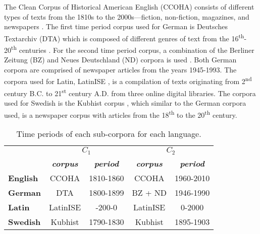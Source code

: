 The Clean Corpus of Historical American English (CCOHA) consists of different types of texts from the 1810s to the 2000s—fiction, non-fiction, magazines, and newspapers \citep{davies2012expanding, alatrash-etal-2020-ccoha}. The first time period corpus used for German is Deutsches Textarchiv (DTA) which is composed of different genres of text from the 16\textsuperscript{th}-20\textsuperscript{th} centuries \citep{dta2017}. For the second time period corpus, a combination of the Berliner Zeitung (BZ) and Neues Deutschland (ND) corpora is used \citep{berliner2018,neues2018}. Both German corpora are comprised of newspaper articles from the years 1945-1993. The corpora used for Latin, LatinISE \citep{mcgillivray-kilgarriff}, is a compilation of texts originating from 2\textsuperscript{nd} century B.C. to 21\textsuperscript{st} century A.D. from three online digital libraries. The corpora used for Swedish is the Kubhist corpus \citep{Kubhist}, which similar to the German corpora used, is a newspaper corpus with articles from the 18\textsuperscript{th} to the 20\textsuperscript{th} century. \hfill \break

\begin{table}[h]
\small
\centering
\begin{tabular}{l|cc|cc|}
\cline{2-5}
\textbf{}      & \multicolumn{2}{c|}{\textbf{$C_1$}}                    & \multicolumn{2}{c|}{\textbf{$C_2$}}                    \\
                                       & \textit{\textbf{corpus}} & \textit{\textbf{period}} & \textit{\textbf{corpus}} & \textit{\textbf{period}} \\ \hline
\multicolumn{1}{|l|}{\textbf{English}} & CCOHA                    & 1810-1860                & CCOHA                    & 1960-2010                \\ \hline
\multicolumn{1}{|l|}{\textbf{German}}  & DTA                      & 1800-1899                & BZ + ND                  & 1946-1990                \\ \hline
\multicolumn{1}{|l|}{\textbf{Latin}}   & LatinISE                 & -200-0                   & LatinISE                 & 0-2000                   \\ \hline
\multicolumn{1}{|l|}{\textbf{Swedish}} & Kubhist                  & 1790-1830                & Kubhist                  & 1895-1903                \\ \hline
\end{tabular}
\caption{Time periods of each sub-corpora for each language.}
\label{tab:subcorpora-time}
\end{table}

